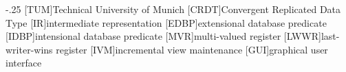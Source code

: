 \documentclass[headsepline,footsepline,footinclude=false,oneside,fontsize=11pt,paper=a4,listof=totoc,bibliography=totoc]{scrbook} %
\begin{document}


\frontmatter{}





\tableofcontents{}

\mainmatter{}







\appendix{}


\begin{acronym}
	\itemsep-.25\baselineskip
	[TUM]{Technical University of Munich}
	[CRDT]{Convergent Replicated Data Type}
	[IR]{intermediate representation}
	[EDBP]{extensional database predicate}
	[IDBP]{intensional database predicate}
	[MVR]{multi-valued register}
	[LWWR]{last-writer-wins register}
	[IVM]{incremental view maintenance}
	[GUI]{graphical user interface}
\end{acronym}

\listoffigures{}
\listoftables{}
\printbibliography{}
\end{document}
